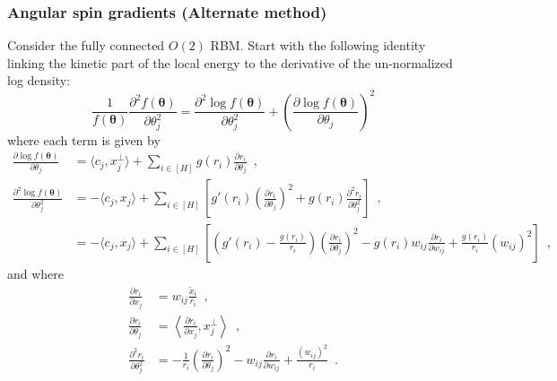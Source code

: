 \documentclass[12pt]{article}
\theoremstyle{definition}%
\theoremstyle{definition}
\theoremstyle{remark}
\begin{document}
\subsubsection{Angular spin gradients (Alternate method)}
Consider the fully connected $O(2)$ RBM. Start with the following identity linking the kinetic part of the local energy to the derivative of the un-normalized log density:
\begin{equation}
	\frac{1}{f(\bm{\theta})}\frac{\partial^2 f(\bm{\theta})}{\partial \theta_j^2}
		= \frac{\partial^2 \log f(\bm{\theta})}{\partial \theta_j^2} + \left(\frac{\partial\log f(\bm{\theta})}{\partial \theta_j}\right)^2
\end{equation}
where each term is given by
\begin{align}
		\frac{\partial \log f(\bm{\theta})}{\partial \theta_j}
		& = \langle c_j, x_j^\perp \rangle + \sum_{i\in[H]} g(r_i) \frac{\partial r_i}{\partial \theta_j} \enspace , \\
		\frac{\partial^2 \log f(\bm{\theta})}{\partial \theta_j^2}
		& = - \langle c_j, x_j \rangle + \sum_{i\in[H]} \left[g'(r_i) \left(\frac{\partial r_i}{\partial \theta_j}\right)^2 + g(r_i) \frac{\partial^2 r_i}{\partial \theta_j^2}\right] \enspace , \\
		& = - \langle c_j, x_j \rangle + \sum_{i\in[H]} \left[\left(g'(r_i) - \frac{g(r_i)}{r_i}\right) \left(\frac{\partial r_i}{\partial \theta_j}\right)^2 - g(r_i) w_{ij}\frac{\partial r_i}{\partial w_{ij}} + \frac{g(r_i)}{r_i}(w_{ij})^2 \right] \enspace ,
\end{align}
and where
\begin{align}
	\frac{\partial r_i}{\partial x_j}
		& = w_{ij}\frac{\tilde{x}_i}{r_i} \enspace , \\
	\frac{\partial r_i}{\partial \theta_j}
		& = \left\langle 	\frac{\partial r_i}{\partial x_j}, x_j^\perp \right\rangle \enspace , \\
	\frac{\partial^2 r_i}{\partial \theta_j^2}
		& = -\frac{1}{r_i} \left(\frac{\partial r_i}{\partial \theta_j}\right)^2 - w_{ij}\frac{\partial r_i}{\partial w_{ij}} + \frac{(w_{ij})^2}{r_i} \enspace .
\end{align}
\end{document}
